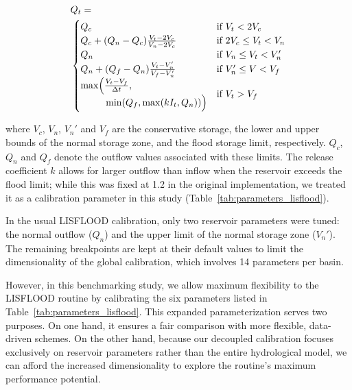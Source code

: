 \documentclass[hess, manuscript]{copernicus}
\begin{document}
\begin{equation}
    \label{eq:lisflood}
    \begin{split}
    & Q_t = \\
    & \begin{cases}
        Q_c & \text{if } V_t < 2 V_c \\
        Q_c + ( Q_n - Q_c ) \frac{V_t - 2 V_c}{V_n - 2 V_c} & \text{if } 2 V_c \leq V_t < V_n \\
        Q_n & \text{if } V_n \leq V_t < V_n' \\
        Q_n + ( Q_f - Q_n ) \frac{V_t - V_n'}{V_f - V_n'} & \text{if } V_n' \leq V < V_f \\
        \begin{aligned} 
            \max \Bigl( & \tfrac{V_t - V_f}{\Delta t}, \\
            & \min(Q_f, \max ( k I_t, Q_n ) ) \Bigr) 
        \end{aligned} & \text{if } V_t > V_f
    \end{cases}
    \end{split}
\end{equation}

where $V_c$, $V_n$, $V_n'$ and $V_f$ are the conservative storage, the lower and upper bounds of the normal storage zone, and the flood storage limit, respectively. $Q_c$, $Q_n$ and $Q_f$ denote the outflow values associated with these limits. The release coefficient $k$ allows for larger outflow than inflow when the reservoir exceeds the flood limit; while this was fixed at 1.2 in the original implementation, we treated it as a calibration parameter in this study (Table~\ref{tab:parameters_lisflood}).

In the usual LISFLOOD calibration, only two reservoir parameters were tuned: the normal outflow ($Q_n$) and the upper limit of the normal storage zone ($V_n'$). The remaining breakpoints are kept at their default values to limit the dimensionality of the global calibration, which involves 14 parameters per basin.

However, in this benchmarking study, we allow maximum flexibility to the LISFLOOD routine by calibrating the six parameters listed in Table~\ref{tab:parameters_lisflood}. This expanded parameterization serves two purposes. On one hand, it ensures a fair comparison with more flexible, data-driven schemes. On the other hand, because our decoupled calibration focuses exclusively on reservoir parameters rather than the entire hydrological model, we can afford the increased dimensionality to explore the routine's maximum performance potential.
\end{document}
